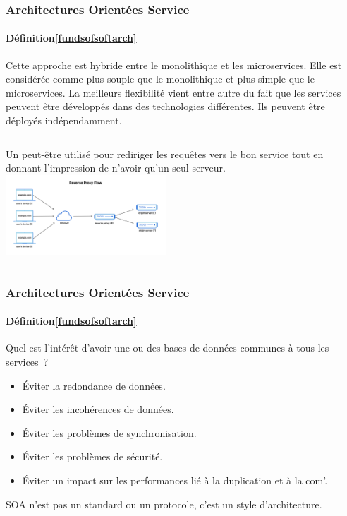 \documentclass{beamer}
\begin{document}
    \begin{frame}
        \transdissolve
        \frametitle{Architectures Orientées Service}
        \framesubtitle{Définition\cref{fundsofsoftarch}}
        Cette approche est hybride entre le monolithique et les microservices.
        \bigbreak
        Elle est considérée comme plus souple que le monolithique et plus simple que le microservices.
        \bigbreak
        La meilleurs flexibilité vient entre autre du fait que les services peuvent être développés dans des technologies différentes.
        Ils peuvent être déployés indépendamment.
        \bigbreak
        \begin{columns}
            Un  peut-être utilisé pour rediriger les requêtes vers le bon service tout en donnant l'impression de n'avoir qu'un seul serveur.
            \centering
            \includegraphics[width=6cm]{image/reverse-proxy-flow}
        \end{columns}
    \end{frame}

    \begin{frame}
        \transdissolve
        \frametitle{Architectures Orientées Service}
        \framesubtitle{Définition\cref{fundsofsoftarch}}
        Quel est l'intérêt d'avoir une ou des bases de données communes à tous les services~?
        \pause
        \bigbreak
        \begin{itemize}
            \item Éviter la redondance de données.
            \item Éviter les incohérences de données.
            \item Éviter les problèmes de synchronisation.
            \item Éviter les problèmes de sécurité.
            \item Éviter un impact sur les performances lié à la duplication et à la com'.
        \end{itemize}
        \begin{dangercolorbox}
            SOA n'est pas un standard ou un protocole, c'est un style d'architecture.
        \end{dangercolorbox}
    \end{frame}
\end{document}
